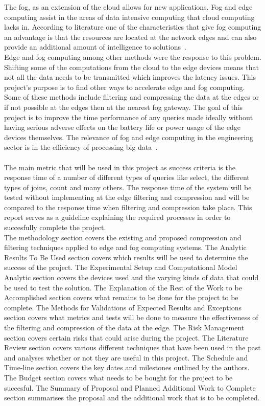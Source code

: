 \documentclass[11pt,journal, a4paper]{IEEEtran}
\begin{document}
\noindent
The fog, as an extension of the cloud allows for new applications. Fog and edge computing assist in the areas of data intensive computing that cloud computing lacks in. According to literature one of the characteristics that give fog computing an advantage is that the resources are located at the network edges and can also provide an additional amount of intelligence to solutions~\cite{I1}. \\

\noindent
Edge and fog computing among other methods were the response to this problem. Shifting some of the computations from the cloud to the edge devices means that not all the data needs to be transmitted which improves the latency issues. This project's purpose is to find other ways to accelerate edge and fog computing. Some of these methods include filtering and compressing the data at the edges or if not possible at the edges then at the nearest fog gateway. The goal of this project is to improve the time performance of any queries made ideally without having serious adverse effects on the battery life or power usage of the edge devices themselves. The relevance of fog and edge computing in the engineering sector is in the efficiency of processing big data~\cite{R1}.\\\\

\noindent
The main metric that will be used in this project as success criteria is the response time of a number of different types of queries like select, the different types of joins, count and many others. The response time of the system will be tested without implementing at the edge filtering and compression and will be compared to the response time when filtering and compression take place. This report serves as a guideline explaining the required processes in order to succesfully complete the project. \\

\noindent
The methodology section covers the existing and proposed compression and filtering techniques applied to edge and fog computing systems.
The Analytic Results To Be Used section covers which results will be used to determine the success of the project.
The Experimental Setup and Computational Model Analytic section covers the devices used and the varying kinds of data that could be used to test the solution. The Explanation of the Rest of the Work to be Accomplished section covers what remains to be done for the project to be complete.
The Methods for Validations of Expected Results and Exceptions section covers what metrics and tests will be done to measure the effectiveness of the filtering and compression of the data at the edge.
The Risk Management section covers certain risks that could arise during the project.
The Literature Review section covers various different techniques that have been used in the past and analyses whether or not they are useful in this project.
The Schedule and Time-line section covers the key dates and milestones outlined by the authors.
The Budget section covers what needs to be bought for the project to be succesful.
The Summary of Proposal and Planned Additional Work to Complete section summarises the proposal and the additional work that is to be completed.
\end{document}
